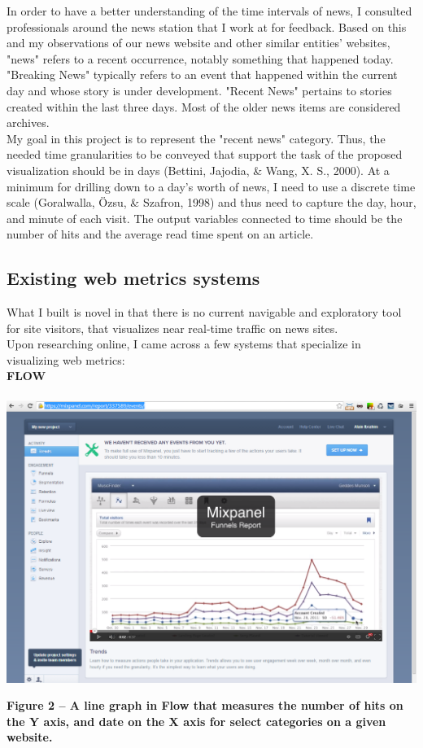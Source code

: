 \documentclass[12pt]{article}
\begin{document}
In order to have a better understanding of the time intervals of news, I consulted professionals around the news station that I work at for feedback. Based on this and my observations of our news website and other similar entities' websites, "news" refers to a recent occurrence, notably something that happened today. "Breaking News" typically refers to an event that happened within the current day and whose story is under development. "Recent News" pertains to stories created within the last three days. Most of the older news items are considered archives. \\
 My goal in this project is to represent the "recent news" category. Thus, the needed time granularities to be conveyed that support the task of the proposed visualization should be in days (Bettini, Jajodia, \& Wang, X. S., 2000). At a minimum for drilling down to a day's worth of news, I need to use a discrete time scale (Goralwalla, \"{O}zsu, \& Szafron, 1998) and thus need to capture the day, hour, and minute of each visit. The output variables connected to time should be the number of hits and the average read time spent on an article.

\newpage

\subsection{Existing web metrics systems}
What I built is novel in that there is no current navigable and exploratory tool for site visitors, that visualizes near real-time traffic on news sites. \\
Upon researching online, I came across a few systems that specialize in visualizing web metrics: \\

\noindent\textbf{FLOW} \\ \\
\noindent\includegraphics[scale=0.45]{img/flow}
\begin{singlespace}
\noindent\textbf{Figure 2 -- A line graph in Flow that measures the number of hits on the Y axis, and date on the X axis for select categories on a given website.} \\
\end{singlespace}
\end{document}
